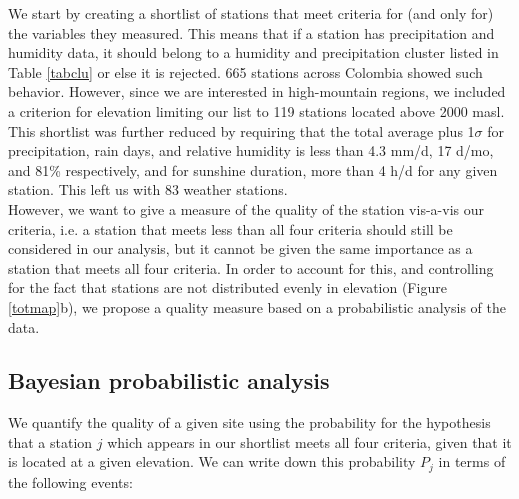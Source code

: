 \documentclass[a4paper,fleqn,usenatbib]{mnras}
\begin{document}
We start by creating a shortlist of stations that meet criteria for (and only for) the variables they measured. This means that if a station has precipitation and humidity data, it should belong to a humidity and precipitation cluster listed in Table \ref{tabclu} or else it is rejected. 665 stations across Colombia showed such behavior. However, since we are interested in high-mountain regions, we included a criterion for elevation limiting our list to 119 stations located above 2000 masl. This shortlist was further reduced by requiring that the total average plus 1$\sigma$ for precipitation, rain days, and relative humidity is less than 4.3 mm/d, 17 d/mo, and 81\% respectively, and for sunshine duration, more than 4 h/d for any given station. This left us with 83 weather stations. \\

However, we want to give a measure of the quality of the station vis-a-vis our criteria, i.e. a station that meets less than all four criteria should still be considered in our analysis, but it cannot be given the same importance as a station that meets all four criteria. In order to account for this, and controlling for the fact that stations are not distributed evenly in elevation (Figure \ref{totmap}b), we propose a quality measure based on a probabilistic analysis of the data.

\subsection{Bayesian probabilistic analysis}\label{bpa}

We quantify the quality of a given site using the probability for the hypothesis that a station $j$ which appears in our shortlist meets all four criteria, given that it is located at a given elevation. We can write down this probability $P_j$ in terms of the following events:
\end{document}
